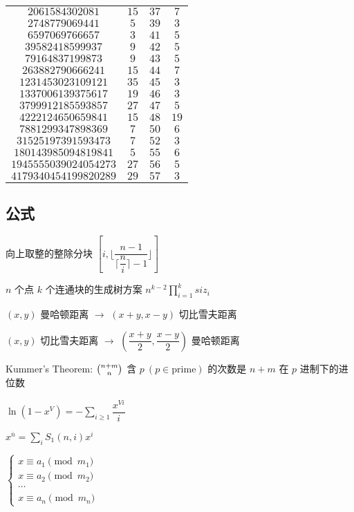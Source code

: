 \documentclass[12pt]{ctexart}
\begin{document}
\begin{table}[H]
\begin{tabular}{c|c|c|c}
		$2061584302081$       & $15$  & $37$ & $7$       \\
		$2748779069441$       & $5$   & $39$ & $3$       \\
		$6597069766657$       & $3$   & $41$ & $5$       \\
		$39582418599937$      & $9$   & $42$ & $5$       \\
		$79164837199873$      & $9$   & $43$ & $5$       \\
		$263882790666241$     & $15$  & $44$ & $7$       \\
		$1231453023109121$    & $35$  & $45$ & $3$       \\
		$1337006139375617$    & $19$  & $46$ & $3$       \\
		$3799912185593857$    & $27$  & $47$ & $5$       \\
		$4222124650659841$    & $15$  & $48$ & $19$      \\
		$7881299347898369$    & $7$   & $50$ & $6$       \\
		$31525197391593473$   & $7$   & $52$ & $3$       \\
		$180143985094819841$  & $5$   & $55$ & $6$       \\
		$1945555039024054273$ & $27$  & $56$ & $5$       \\
		$4179340454199820289$ & $29$  & $57$ & $3$       \\
		\bottomrule
	\end{tabular}

\end{table}
\subsection{公式}

向上取整的整除分块 $[i,\lfloor\dfrac{n-1}{\lceil\dfrac ni \rceil-1}\rfloor]$

$n$ 个点 $k$ 个连通块的生成树方案 $n^{k-2}\prod\limits_{i=1}^k siz_i$

$(x,y)$ 曼哈顿距离 $\to$ $(x+y,x-y)$ 切比雪夫距离

$(x,y)$ 切比雪夫距离 $\to$ $(\dfrac{x+y}{2},\dfrac{x-y}{2})$ 曼哈顿距离

Kummer's Theorem: $\tbinom{n+m}{n}$ 含 $p~(p\in \text {prime})$ 的次数是 $n+m$ 在 $p$ 进制下的进位数

$\ln (1-x^V)=-\sum\limits_{i\ge1}\dfrac{x^{Vi}}{i}$

$x^{\bar n}=\sum\limits_i S_1(n,i)x^i$

$\begin{cases}x\equiv a_1\pmod {m_1}\\x\equiv a_2\pmod {m_2}\\\cdots\\x\equiv a_n\pmod {m_n}\end{cases}$
\end{document}
